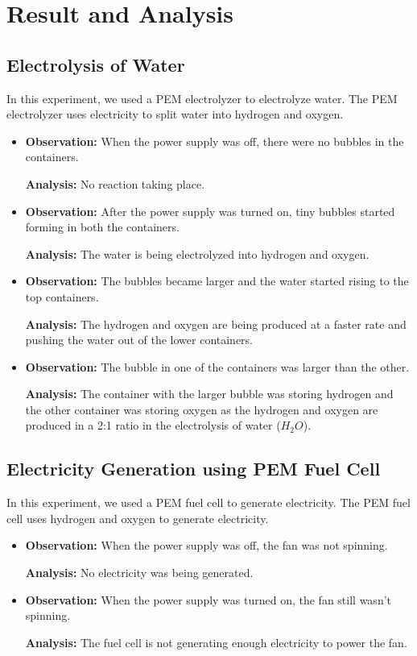 \documentclass[a4paper, 12pt, english]{article}
\begin{document}
\section{Result and Analysis}
\subsection{Electrolysis of Water}
In this experiment, we used a PEM electrolyzer to electrolyze water. The PEM
electrolyzer uses electricity to split water into hydrogen and oxygen.

\begin{itemize}
    \item \textbf{Observation:} When the power supply was off, there were no bubbles in the containers.

          \textbf{Analysis:} No reaction taking place.
    \item \textbf{Observation:} After the power supply was turned on, tiny bubbles started forming in both the containers.

          \textbf{Analysis:} The water is being electrolyzed into hydrogen and oxygen.
    \item \textbf{Observation:} The bubbles became larger and the water started rising to the top containers.

          \textbf{Analysis:} The hydrogen and oxygen are being produced at a faster rate and pushing the water out of the lower containers.
    \item \textbf{Observation:} The bubble in one of the containers was larger than the other.

          \textbf{Analysis:} The container with the larger bubble was storing hydrogen and the other container was storing oxygen as the hydrogen and oxygen are produced in a 2:1 ratio in the electrolysis of water ($H_2O$).
\end{itemize}

\subsection{Electricity Generation using PEM Fuel Cell}
In this experiment, we used a PEM fuel cell to generate electricity. The PEM
fuel cell uses hydrogen and oxygen to generate electricity.

\begin{itemize}
    \item \textbf{Observation:} When the power supply was off, the fan was not spinning.

          \textbf{Analysis:} No electricity was being generated.
    \item \textbf{Observation:} When the power supply was turned on, the fan still wasn't spinning.

          \textbf{Analysis:} The fuel cell is not generating enough electricity to power the fan.
\end{itemize}
\end{document}
